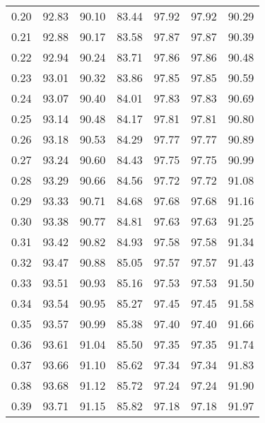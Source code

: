 \begin{tabular}{|c|c|c|c|c|c|c|}
      0.20 &     92.83 &     90.10 &      83.44 &   97.92 &      97.92 &         90.29 \\
      0.21 &     92.88 &     90.17 &      83.58 &   97.87 &      97.87 &         90.39 \\
      0.22 &     92.94 &     90.24 &      83.71 &   97.86 &      97.86 &         90.48 \\
      0.23 &     93.01 &     90.32 &      83.86 &   97.85 &      97.85 &         90.59 \\
      0.24 &     93.07 &     90.40 &      84.01 &   97.83 &      97.83 &         90.69 \\
      0.25 &     93.14 &     90.48 &      84.17 &   97.81 &      97.81 &         90.80 \\
      0.26 &     93.18 &     90.53 &      84.29 &   97.77 &      97.77 &         90.89 \\
      0.27 &     93.24 &     90.60 &      84.43 &   97.75 &      97.75 &         90.99 \\
      0.28 &     93.29 &     90.66 &      84.56 &   97.72 &      97.72 &         91.08 \\
      0.29 &     93.33 &     90.71 &      84.68 &   97.68 &      97.68 &         91.16 \\
      0.30 &     93.38 &     90.77 &      84.81 &   97.63 &      97.63 &         91.25 \\
      0.31 &     93.42 &     90.82 &      84.93 &   97.58 &      97.58 &         91.34 \\
      0.32 &     93.47 &     90.88 &      85.05 &   97.57 &      97.57 &         91.43 \\
      0.33 &     93.51 &     90.93 &      85.16 &   97.53 &      97.53 &         91.50 \\
      0.34 &     93.54 &     90.95 &      85.27 &   97.45 &      97.45 &         91.58 \\
      0.35 &     93.57 &     90.99 &      85.38 &   97.40 &      97.40 &         91.66 \\
      0.36 &     93.61 &     91.04 &      85.50 &   97.35 &      97.35 &         91.74 \\
      0.37 &     93.66 &     91.10 &      85.62 &   97.34 &      97.34 &         91.83 \\
      0.38 &     93.68 &     91.12 &      85.72 &   97.24 &      97.24 &         91.90 \\
      0.39 &     93.71 &     91.15 &      85.82 &   97.18 &      97.18 &         91.97 \\

\end{tabular}
